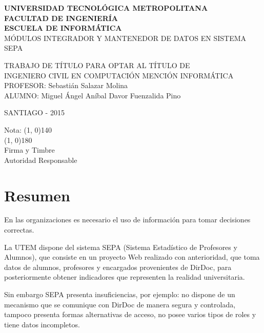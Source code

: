 \documentclass[a4paper,12pt,openany,oneside]{book}
\begin{document}

\begin{center}
\textbf{UNIVERSIDAD TECNOLÓGICA METROPOLITANA\\
FACULTAD DE INGENIERÍA\\
ESCUELA DE INFORMÁTICA}\\
\vspace{3cm}
MÓDULOS INTEGRADOR Y MANTENEDOR DE DATOS EN SISTEMA SEPA
\end{center}
\begin{flushright}
TRABAJO DE TÍTULO PARA OPTAR AL TÍTULO DE\\
INGENIERO CIVIL EN COMPUTACIÓN MENCIÓN INFORMÁTICA\\
\vspace{3cm}
PROFESOR: Sebastián Salazar Molina\\
\vspace{1.5cm}
ALUMNO: Miguel Ángel Aníbal Davor Fuenzalida Pino
\end{flushright}
\vspace{4cm}
\begin{center}
SANTIAGO - 2015
\end{center}
\newpage
\thispagestyle{empty}
\begin{flushright}
\vspace{20mm}
Nota: \line(1, 0){140} \\
\vspace{30 mm}
\line(1, 0){180}\\	
Firma y Timbre\\
Autoridad Responsable
\end{flushright}
\chapter*{Resumen}
\thispagestyle{empty}
En las organizaciones es necesario el uso de información para tomar decisiones correctas.

La UTEM dispone del sistema SEPA (Sistema Estadístico de Profesores y Alumnos), que consiste en un proyecto Web realizado con anterioridad, que toma datos de alumnos, profesores y encargados provenientes de DirDoc, para posteriormente obtener indicadores que representen la realidad universitaria.

Sin embargo SEPA presenta insuficiencias, por ejemplo: no dispone de un mecanismo que se comunique con DirDoc de manera segura y controlada, tampoco presenta formas alternativas de acceso, no posee varios tipos de roles y tiene datos incompletos.
\end{document}
